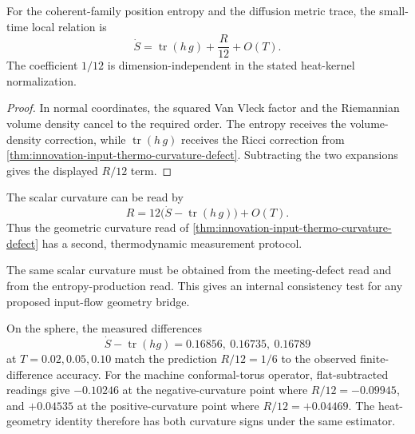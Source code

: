 \begin{theorem}
\label{thm:innovation-input-thermo-local-heat-geometry}
For the coherent-family position entropy and the diffusion metric trace,
the small-time local relation is
$$
\dot S
=
\operatorname{tr}(h\,g)+\frac{R}{12}+O(T).
$$
The coefficient $1/12$ is dimension-independent in the stated heat-kernel
normalization.
\end{theorem}

\begin{proof}
In normal coordinates, the squared Van Vleck factor and the Riemannian
volume density cancel to the required order. The entropy receives the
volume-density correction, while $\operatorname{tr}(h\,g)$ receives the
Ricci correction from
\autoref{thm:innovation-input-thermo-curvature-defect}. Subtracting the
two expansions gives the displayed $R/12$ term.
\end{proof}

\begin{corollary}
\label{cor:innovation-input-thermo-thermodynamic-curvature-read}
The scalar curvature can be read by
$$
R=12\bigl(\dot S-\operatorname{tr}(h\,g)\bigr)+O(T).
$$
Thus the geometric curvature read of
\autoref{thm:innovation-input-thermo-curvature-defect} has a second,
thermodynamic measurement protocol.
\end{corollary}

\begin{principle}
\label{prin:innovation-input-thermo-internal-consistency-test}
The same scalar curvature must be obtained from the meeting-defect read
and from the entropy-production read. This gives an internal consistency
test for any proposed input-flow geometry bridge.
\end{principle}

\begin{principle}
\label{prin:innovation-input-thermo-thermodynamic-numerical-witnesses}
On the sphere, the measured differences
$$
\dot S-\operatorname{tr}(hg)=0.16856,\ 0.16735,\ 0.16789
$$
at $T=0.02,0.05,0.10$ match the prediction $R/12=1/6$ to the observed
finite-difference accuracy. For the machine conformal-torus operator,
flat-subtracted readings give $-0.10246$ at the negative-curvature point
where $R/12=-0.09945$, and $+0.04535$ at the positive-curvature point
where $R/12=+0.04469$. The heat-geometry identity therefore has both
curvature signs under the same estimator.
\end{principle}

